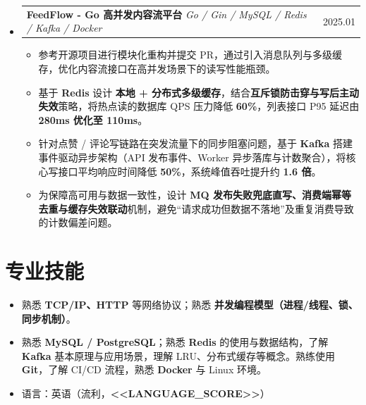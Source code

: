 \documentclass[a4paper,11pt]{article}
\makeatletter
\newcommand{\resumeProjectHeading}[3]{
  \item
  \begin{tabular*}{\linewidth}{@{}l@{\extracolsep{\fill}}r@{}}
    \colorbox{gray!20}{\textbf{#1}} \quad \textit{\small #2} & \small #3
  \end{tabular*}\vspace{0pt}
}
\newcommand{\resumeItem}[1]{\item \small{#1}}
\makeatother
\begin{document}
\begin{itemize}[label={},leftmargin=0pt]
\begin{itemize}[label={$\bullet$},leftmargin=0.15in,topsep=0pt,itemsep=1pt]
  \resumeItem{在保持同等 Agent 能力的前提下进行减重重构，实现 \textbf{内存占用下降 85\%、镜像体积 <40MB、冷启动 <1.5s}，可稳定部署于低配边缘设备。}
\end{itemize}

\resumeProjectHeading
{FeedFlow - Go 高并发内容流平台}
{Go / Gin / MySQL / Redis / Kafka / Docker}
{2025.01}
\begin{itemize}[label={$\bullet$},leftmargin=0.15in,topsep=0pt,itemsep=1pt]
  \resumeItem{参考开源项目进行模块化重构并提交 PR，通过引入消息队列与多级缓存，优化内容流接口在高并发场景下的读写性能瓶颈。}

  \resumeItem{基于 \textbf{Redis} 设计 \textbf{本地 + 分布式多级缓存}，结合\textbf{互斥锁防击穿与写后主动失效}策略，将热点读的数据库 QPS 压力降低 \textbf{60\%}，列表接口 P95 延迟由 \textbf{280ms 优化至 110ms}。}

  \resumeItem{针对点赞 / 评论写链路在突发流量下的同步阻塞问题，基于 \textbf{Kafka} 搭建事件驱动异步架构（API 发布事件、Worker 异步落库与计数聚合），将核心写接口平均响应时间降低 \textbf{50\%}，系统峰值吞吐提升约 \textbf{1.6 倍}。}

  \resumeItem{为保障高可用与数据一致性，设计 \textbf{MQ 发布失败兜底直写、消费端幂等去重与缓存失效联动}机制，避免“请求成功但数据不落地”及重复消费导致的计数偏差问题。}

\end{itemize}

\end{itemize}
\section{\textcolor{blue!60!black}{专业技能}}

\begin{itemize}[label={$\bullet$},leftmargin=0.15in]

  \item \small 熟悉 \textbf{TCP/IP、HTTP} 等网络协议；熟悉 \textbf{并发编程模型（进程/线程、锁、同步机制）}。

  \item \small 熟悉 \textbf{MySQL / PostgreSQL}；熟悉 \textbf{Redis} 的使用与数据结构，了解 \textbf{Kafka} 基本原理与应用场景，理解 LRU、分布式缓存等概念。熟练使用 \textbf{Git}，了解 CI/CD 流程，熟悉 \textbf{Docker} 与 Linux 环境。

  \item \small 语言：英语（流利，\textbf{<<LANGUAGE_SCORE>>}）
\end{itemize}
\end{document}
